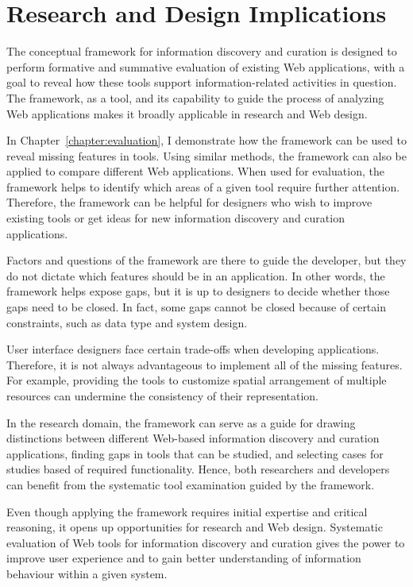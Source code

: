 \chapter{Research and Design Implications}
\label{chapter:implications}

The conceptual framework for information discovery and curation is designed to perform formative and summative evaluation of existing Web applications, with a goal to reveal how these tools support information-related activities in question. The framework, as a tool, and its capability to guide the process of analyzing Web applications makes it broadly applicable in research and Web design. 

In Chapter~\ref{chapter:evaluation}, I demonstrate how the framework can be used to reveal missing features in tools. Using similar methods, the framework can also be applied to compare different Web applications. When used for evaluation, the framework helps to identify which areas of a given tool require further attention. Therefore, the framework can be helpful for designers who wish to improve existing tools or get ideas for new information discovery and curation applications. 

Factors and questions of the framework are there to guide the developer, but they do not dictate which features should be in an application. In other words, the framework helps expose gaps, but it is up to designers to decide whether those gaps need to be closed. In fact, some gaps cannot be closed because of certain constraints, such as data type and system design.

User interface designers face certain trade-offs when developing applications. Therefore, it is not always advantageous to implement all of the missing features. For example, providing the tools to customize spatial arrangement of multiple resources can undermine the consistency of their representation. 

In the research domain, the framework can serve as a guide for drawing distinctions between different Web-based information discovery and curation applications, finding gaps in tools that can be studied, and selecting cases for studies based of required functionality. Hence, both researchers and developers can benefit from the systematic tool examination guided by the framework.

Even though applying the framework requires initial expertise and critical reasoning, it opens up opportunities for research and Web design. Systematic evaluation of Web tools for information discovery and curation gives the power to improve user experience and to gain better understanding of information behaviour within a given system. 




